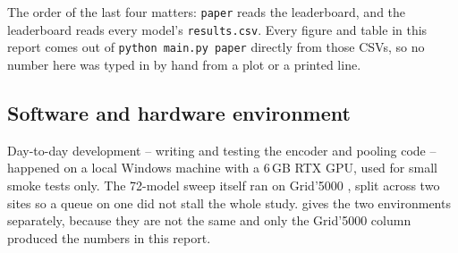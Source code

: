 The order of the last four matters: \texttt{paper} reads the leaderboard, and the leaderboard reads
every model's \texttt{results.csv}. Every figure and table in this report comes out of
\texttt{python main.py paper} directly from those CSVs, so no number here was typed in by hand from
a plot or a printed line.

\subsection{Software and hardware environment}
\label{app:env}

Day-to-day development -- writing and testing the encoder and pooling code -- happened on a local
Windows machine with a 6\,GB RTX GPU, used for small smoke tests only. The 72-model sweep itself ran
on Grid'5000 \citep{balouek2013grid5000}, split across two sites so a queue on one did not stall the
whole study.  gives the two environments separately, because they are not the
same and only the Grid'5000 column produced the numbers in this report.

